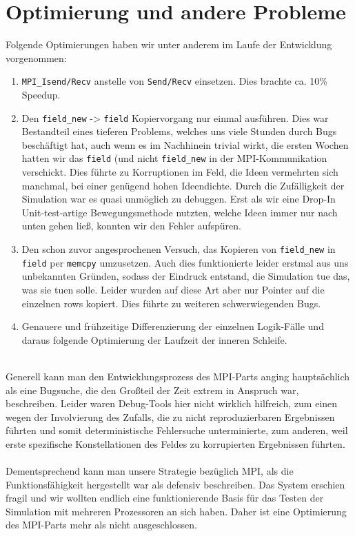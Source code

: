\section{Optimierung und andere Probleme}
Folgende Optimierungen haben wir unter anderem im Laufe der Entwicklung vorgenommen:
\begin{enumerate}
	\item \texttt{MPI\_Isend/Recv} anstelle von \texttt{Send/Recv} einsetzen.
Dies brachte ca. 10\% Speedup.
	\item Den \texttt{field\_new} -\textgreater{} \texttt{field} Kopiervorgang nur einmal ausführen.
Dies war Bestandteil eines tieferen Problems, welches uns viele Stunden durch Bugs beschäftigt hat, auch wenn es im Nachhinein trivial wirkt, die ersten Wochen hatten wir das \texttt{field} (und nicht \texttt{field\_new} in der MPI-Kommunikation verschickt.
Dies führte zu Korruptionen im Feld, die Ideen vermehrten sich manchmal, bei einer genügend hohen Ideendichte.
Durch die Zufälligkeit der Simulation war es quasi unmöglich zu debuggen.
Erst als wir eine Drop-In Unit-test-artige Bewegungsmethode nutzten, welche Ideen immer nur nach unten gehen ließ, konnten wir den Fehler aufspüren.
	\item Den schon zuvor angesprochenen Versuch, das Kopieren von \texttt{field\_new} in \texttt{field} per \texttt{memcpy} umzusetzen.
Auch dies funktionierte leider erstmal aus uns unbekannten Gründen, sodass der Eindruck entstand, die Simulation tue das, was sie tuen solle.
Leider wurden auf diese Art aber nur Pointer auf die einzelnen rows kopiert. Dies führte zu weiteren schwerwiegenden Bugs.
	\item Genauere und frühzeitige Differenzierung der einzelnen Logik-Fälle und daraus folgende Optimierung der Laufzeit der inneren Schleife.
\end{enumerate}
\quad \\
Generell kann man den Entwicklungsprozess des MPI-Parts anging hauptsächlich als eine Bugsuche, die den Großteil der Zeit extrem in Anspruch war, beschreiben.
Leider waren Debug-Tools hier nicht wirklich hilfreich, zum einen wegen der Involvierung des Zufalls, die zu nicht reproduzierbaren Ergebnissen führten und somit deterministische Fehlersuche unterminierte, zum anderen, weil erste spezifische Konstellationen des Feldes zu korrupierten Ergebnissen führten. \\
\quad \\
Dementsprechend kann man unsere Strategie bezüglich MPI, als die Funktionsfähigkeit hergestellt war als defensiv beschreiben.
Das System erschien fragil und wir wollten endlich eine funktionierende Basis für das Testen der Simulation mit mehreren Prozessoren an sich haben.
Daher ist eine Optimierung des MPI-Parts mehr als nicht ausgeschlossen.
